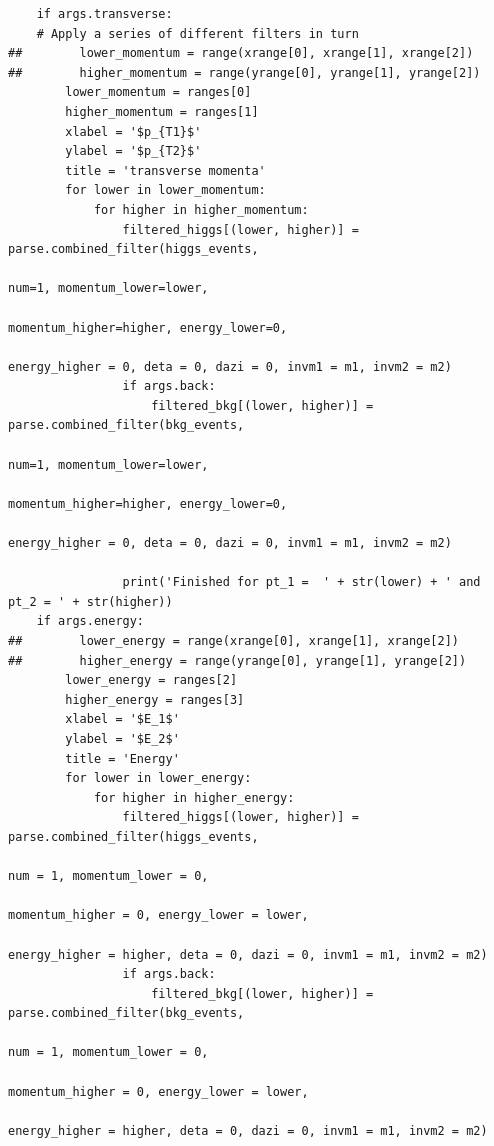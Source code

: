 \documentclass{article}
\begin{document}
\begin{lstlisting}
    if args.transverse:
    # Apply a series of different filters in turn
##        lower_momentum = range(xrange[0], xrange[1], xrange[2])
##        higher_momentum = range(yrange[0], yrange[1], yrange[2])
        lower_momentum = ranges[0]
        higher_momentum = ranges[1]
        xlabel = '$p_{T1}$'
        ylabel = '$p_{T2}$'
        title = 'transverse momenta'
        for lower in lower_momentum:
            for higher in higher_momentum:
                filtered_higgs[(lower, higher)] = parse.combined_filter(higgs_events,
                                                                        num=1, momentum_lower=lower,
                                                                        momentum_higher=higher, energy_lower=0,
                                                                        energy_higher = 0, deta = 0, dazi = 0, invm1 = m1, invm2 = m2)
                if args.back:
                    filtered_bkg[(lower, higher)] = parse.combined_filter(bkg_events,
                                                                          num=1, momentum_lower=lower,
                                                                          momentum_higher=higher, energy_lower=0,
                                                                          energy_higher = 0, deta = 0, dazi = 0, invm1 = m1, invm2 = m2)

                print('Finished for pt_1 =  ' + str(lower) + ' and pt_2 = ' + str(higher))
    if args.energy:
##        lower_energy = range(xrange[0], xrange[1], xrange[2])
##        higher_energy = range(yrange[0], yrange[1], yrange[2])
        lower_energy = ranges[2]
        higher_energy = ranges[3]
        xlabel = '$E_1$'
        ylabel = '$E_2$'
        title = 'Energy'
        for lower in lower_energy:
            for higher in higher_energy:
                filtered_higgs[(lower, higher)] = parse.combined_filter(higgs_events,
                                                                        num = 1, momentum_lower = 0,
                                                                        momentum_higher = 0, energy_lower = lower,
                                                                        energy_higher = higher, deta = 0, dazi = 0, invm1 = m1, invm2 = m2)
                if args.back:
                    filtered_bkg[(lower, higher)] = parse.combined_filter(bkg_events,
                                                                          num = 1, momentum_lower = 0,
                                                                          momentum_higher = 0, energy_lower = lower,
                                                                          energy_higher = higher, deta = 0, dazi = 0, invm1 = m1, invm2 = m2)


\end{lstlisting}
\end{document}
